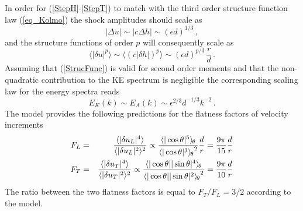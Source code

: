 \documentclass{jfm}
\newcommand{\meane}[1]{\langle #1 \rangle}
\newcommand{\meant}[1]{{\langle #1 \rangle_{\hspace{-0.4mm}\theta}}}
\begin{document}
In order for (\ref{StepH}-\ref{StepT}) to match with the third order structure function law (\ref{eq_Kolmo})  the shock amplitudes should scale as
\begin{equation} \label{Strength}
 | \Delta u | \sim | c \Delta h | \sim (\epsilon d)^{1/3} \, ,
\end{equation} 
and the structure functions of order $ p $ will consequently scale as
\begin{equation} \label{StrucFunc}
\meane{|\delta u |^p}  \sim \meane{(c|\delta h |)^p} \sim  (\epsilon  d)^{p/3} \,  \frac{r}{d} \, .
\end{equation} 
Assuming that (\ref{StrucFunc}) is valid for second order moments and that the non-quadratic contribution to the KE spectrum is negligible the corresponding scaling law for the energy spectra reads
\begin{equation} \label{Spectra}
E_K(k)  \sim  E_A(k) \sim \epsilon ^{2/3} d^{-1/3} k^{-2} \, .
\end{equation} 
The  model  provides the following predictions for the flatness factors of velocity increments
\begin{eqnarray} \label{FL}
F_L &=&  \frac{\meane{|\delta u_L|^4}}{\meane{|\delta u_L|^2}^2}
\propto 
\frac{\meant{|\cos\theta|^5}}{\meant{|\cos\theta|^3}^2} \frac{d}{r}   = \frac{9\pi}{15}  \frac{d}{r} \\ \label{FT}
F_T &=&  \frac{\meane{|\delta u_T|^4}}{\meane{|\delta u_T|^2}^2} 
\propto
\frac{\meant{|\cos\theta||\sin\theta|^4}}{\meant{|\cos\theta||\sin\theta|^2}^2} =  \frac{9\pi}{10}  \frac{d}{r} 
\end{eqnarray}
The ratio between the two flatness factors is equal  to
$F_T/F_L = 3/2$ according to the model. 
\end{document}
